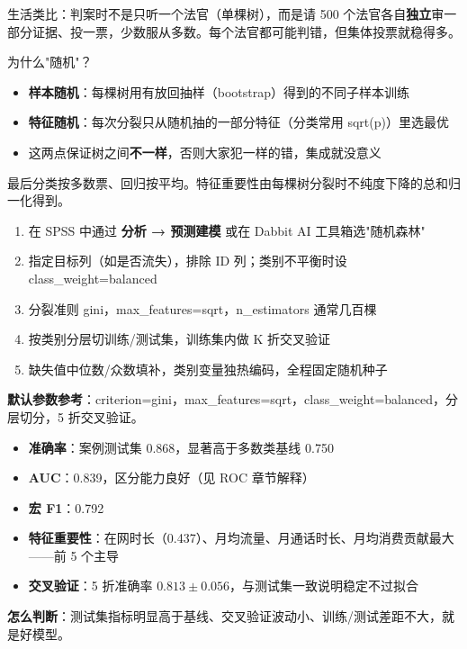 \begin{algoprinciple}
生活类比：判案时不是只听一个法官（单棵树），而是请 500 个法官各自\textbf{独立}审一部分证据、投一票，少数服从多数。每个法官都可能判错，但集体投票就稳得多。

为什么"随机"？
\begin{itemize}
    \item \textbf{样本随机}：每棵树用有放回抽样（bootstrap）得到的不同子样本训练
    \item \textbf{特征随机}：每次分裂只从随机抽的一部分特征（分类常用 sqrt(p)）里选最优
    \item 这两点保证树之间\textbf{不一样}，否则大家犯一样的错，集成就没意义
\end{itemize}

最后分类按多数票、回归按平均。特征重要性由每棵树分裂时不纯度下降的总和归一化得到。
\end{algoprinciple}

\begin{algosposs}
\begin{enumerate}
    \item 在 SPSS 中通过 \textbf{分析 → 预测建模} 或在 Dabbit AI 工具箱选"随机森林"
    \item 指定目标列（如是否流失），排除 ID 列；类别不平衡时设 class\_weight=balanced
    \item 分裂准则 gini，max\_features=sqrt，n\_estimators 通常几百棵
    \item 按类别分层切训练/测试集，训练集内做 K 折交叉验证
    \item 缺失值中位数/众数填补，类别变量独热编码，全程固定随机种子
\end{enumerate}

\textbf{默认参数参考}：criterion=gini，max\_features=sqrt，class\_weight=balanced，分层切分，5 折交叉验证。
\end{algosposs}

\begin{algoresult}
\begin{itemize}
    \item \textbf{准确率}：案例测试集 0.868，显著高于多数类基线 0.750
    \item \textbf{AUC}：0.839，区分能力良好（见 ROC 章节解释）
    \item \textbf{宏 F1}：0.792
    \item \textbf{特征重要性}：在网时长（0.437）、月均流量、月通话时长、月均消费贡献最大——前 5 个主导
    \item \textbf{交叉验证}：5 折准确率 $0.813\pm0.056$，与测试集一致说明稳定不过拟合
\end{itemize}

\textbf{怎么判断}：测试集指标明显高于基线、交叉验证波动小、训练/测试差距不大，就是好模型。
\end{algoresult}

